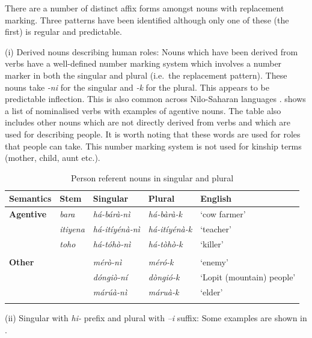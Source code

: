 \documentclass[output=paper]{langsci/langscibook}
\begin{document}
There are a number of distinct affix forms amongst nouns with replacement marking. Three patterns have been identified although only one of these (the first) is regular and predictable.

(i) Derived nouns describing human roles: Nouns which have been derived from verbs have a well-defined number marking system which involves a number marker in both the singular and plural (i.e.\ the replacement pattern). These nouns take \textit{{}-ni }for the singular and \textit{-k} for the plural. This appears to be predictable inflection. This is also common across Nilo-Saharan languages \citep[243]{Dimmendaal2000}.  shows a list of nominalised verbs with examples of agentive nouns. The table also includes other nouns which are not directly derived from verbs and which are used for describing people. It is worth noting that these words are used for roles that people can take. This number marking system is not used for kinship terms (mother, child, aunt etc.). 

\begin{table}
\begin{tabularx}{\textwidth}{XXXXX}
\lsptoprule

 \textbf{Semantics} & \textbf{Stem} & \textbf{Singular} & \textbf{Plural} & \textbf{English}\\ \midrule
\mdseries \textbf{Agentive} & \itshape bara & \itshape h\'{a}-b\'{a}r\`{a}-n\`{i} & \itshape h\'{a}-b\`{a}r\`{a}-k & ‘cow farmer’\\
& \itshape itiyena & \itshape h\'{a}-it\'{i}y\'{e}n\`{a}-n\`{i} & \itshape h\'{a}-it\'{i}y\'{e}n\`{a}-k & ‘teacher’\\
& \itshape toho & \itshape h\'{a}-t\'{o}h\`{o}-n\`{i} & \itshape há-tòhò-k & ‘killer’\\
&  &  &  & \\
\mdseries \textbf{Other} &  & \itshape m\'{e}r\`{o}-n\`{i} & \itshape m\'{e}r\'{o}-k & ‘enemy’\\
&  & \itshape d\'{o}ngi\`{o}-n\'{i} & \itshape d\`{o}ngi\'{o}-k & ‘Lopit (mountain) people’\\
&  & \itshape m\'{a}r\'{u}\`{a}-n\`{i} & \itshape m\'{a}ru\`{a}-k & ‘elder’\\
\lspbottomrule
\end{tabularx}
\caption{Person referent nouns in singular and plural}
\label{tab:moodie:14}
\end{table}

(ii) Singular with \textit{hi-} prefix and plural with \textit{–i} suffix: Some examples are shown in . 
\end{document}
